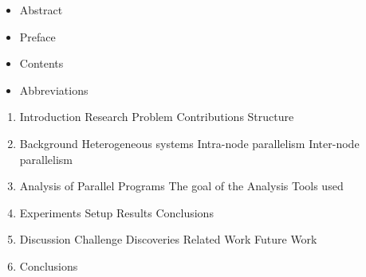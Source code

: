 \begin{itemize}
\item Abstract
\item Preface
\item Contents
\item Abbreviations
\end{itemize}

\begin{enumerate}
\item Introduction
  \subitem Research Problem
  \subitem Contributions
  \subitem Structure

\item Background
  \subitem Heterogeneous systems
  \subitem Intra-node parallelism
  \subitem Inter-node parallelism

\item Analysis of Parallel Programs
  \subitem The goal of the Analysis
  \subitem Tools used

\item Experiments
  \subitem Setup
  \subitem Results
  \subitem Conclusions

\item Discussion
  \subitem Challenge
  \subitem Discoveries
  \subitem Related Work
  \subitem Future Work
\item Conclusions
\end{enumerate}

